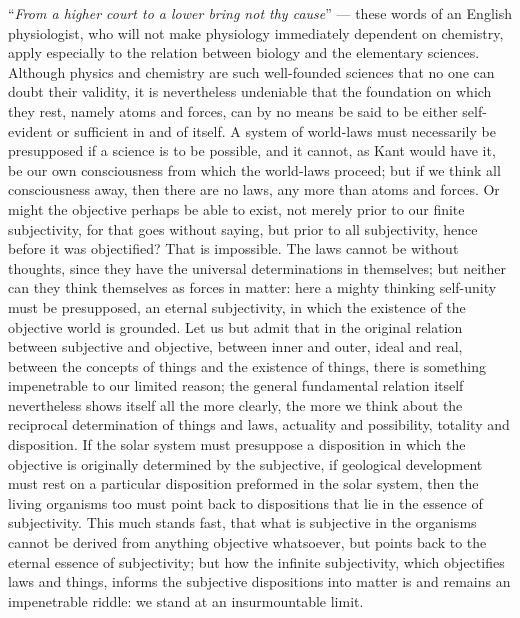 \documentclass[12pt,a4paper]{article}
\newcommand{\opage}[1]{\marginnote{\footnotesize\textit{[#1]}}}
\begin{document}
\opage{41}``\emph{From a higher court to a lower bring not thy cause}''
--- these words of an English physiologist, who will not make
physiology immediately dependent on chemistry, apply especially to the
relation between biology and the elementary sciences. Although physics
and chemistry are such well-founded sciences that no one can doubt
their validity, it is nevertheless undeniable that the foundation on
which they rest, namely atoms and forces, can by no means be said to
be either self-evident or sufficient in and of itself. A system of
world-laws must necessarily be presupposed if a science is to be
possible, and it cannot, as Kant would have it, be our own
consciousness from which the world-laws proceed; but if we think all
consciousness away, then there are no laws, any more than atoms and
forces. Or might the objective perhaps be able to exist, not merely
prior to our finite subjectivity, for that goes without saying, but
prior to all subjectivity, hence before it was objectified? That is
impossible. The laws cannot be without thoughts, since they have the
universal determinations in themselves; but neither can they think
themselves as forces in matter: here a mighty thinking self-unity must
be presupposed, an eternal subjectivity, in which the existence of the
objective world is grounded. Let us but admit that in the original
relation between subjective and objective, between inner and outer,
ideal and real, between the concepts of things and the existence of
things, there is something impenetrable to our limited reason; the
general fundamental relation itself nevertheless shows itself all the
more clearly, the more we think about the reciprocal determination of
things and laws, actuality and possibility, totality and disposition.
If the solar system must presuppose a disposition in which the
objective is originally determined by the subjective, if geological
development must rest on a particular disposition preformed in the
solar system, then the living organisms too must point back to
dispositions that lie in the essence of subjectivity. This much stands
fast, that what is subjective in the organisms cannot be derived from
anything objective whatsoever, but points back to the eternal essence
of subjectivity; but how the infinite subjectivity, which objectifies
laws and things, informs the subjective dispositions into matter
\opage{42}is and remains an impenetrable riddle: we stand at an
insurmountable limit.
\end{document}
